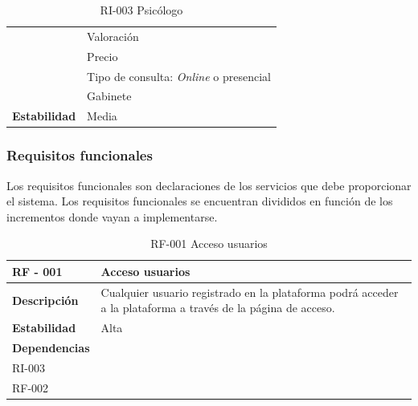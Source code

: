 \begin{table}[htpb]
\begin{tabularx}{\textwidth}{|l|X|}
                   & Valoración                                                                   \\ 
                   & Precio                                                                       \\ 
                   & Tipo de consulta: \textit{Online} o presencial                                        \\
                   & Gabinete                                                                     \\ \hline
\textbf{Estabilidad}        & Media                                                                        \\ \hline
\end{tabularx}
\caption{RI-003 Psicólogo}
\end{table}


\subsubsection{Requisitos funcionales}


Los requisitos funcionales son declaraciones de los servicios que debe proporcionar el sistema. Los requisitos funcionales se encuentran divididos en función de los incrementos donde vayan a implementarse\cite{sommerville}.




\begin{table}[htpb]
\centering
\begin{tabularx}{\textwidth}{|l|X|}
\hline
\rowcolor[gray]{0.9}\textbf{RF - 001 }                               & \textbf{Acceso usuarios                                                                                             } \\ \hline
\textbf{Descripción}                             & Cualquier usuario registrado en la plataforma podrá acceder a la plataforma a través de la página de acceso. \\ \hline
\textbf{Estabilidad}                             & Alta                                                                                                         \\ \hline
\textbf{Dependencias} & \begin{tabular}[c]{@{}l@{}}RI-001 \\ RI-003 \\ RF-002\end{tabular}                                           \\ \hline
\end{tabularx}
\caption{RF-001 Acceso usuarios}
\end{table}


